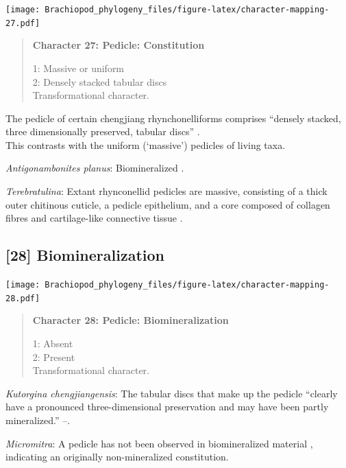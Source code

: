 \documentclass[openany]{book}
\begin{document}
\texttt{[image: Brachiopod\_phylogeny\_files/figure-latex/character-mapping-27.pdf]}

\begin{quote}
\textbf{Character 27: Pedicle: Constitution}

1: Massive or uniform\\
2: Densely stacked tabular discs\\
Transformational character.
\end{quote}

The pedicle of certain chengjiang rhynchonelliforms comprises ``densely
stacked, three dimensionally preserved, tabular discs''
\citep{Holmer2018Evolutionarysignificance}.\\
This contrasts with the uniform (`massive') pedicles of living taxa.

\hypertarget{Antigonambonites_planus-coding-27}{}
\emph{Antigonambonites planus}: Biomineralized
\citep{Holmer2018Evolutionarysignificance}.

\hypertarget{Terebratulina-coding-27}{}
\emph{Terebratulina}: Extant rhynconellid pedicles are massive,
consisting of a thick outer chitinous cuticle, a pedicle epithelium, and
a core composed of collagen fibres and cartilage-like connective tissue
\citep{Holmer2018Evolutionarysignificance}.

\subsection*{{[}28{]} Biomineralization}\label{biomineralization}

\texttt{[image: Brachiopod\_phylogeny\_files/figure-latex/character-mapping-28.pdf]}

\begin{quote}
\textbf{Character 28: Pedicle: Biomineralization}

1: Absent\\
2: Present\\
Transformational character.
\end{quote}

\hypertarget{Kutorgina_chengjiangensis-coding-28}{}
\emph{Kutorgina chengjiangensis}: The tabular discs that make up the
pedicle ``clearly have a pronounced three-dimensional preservation and
may have been partly mineralized.'' --\citet{Holmer2018Theattachment}.

\hypertarget{Micromitra-coding-28}{}
\emph{Micromitra}: A pedicle has not been observed in biomineralized
material \citep{Williams1998Thediversity}, indicating an originally
non-mineralized constitution.
\end{document}

